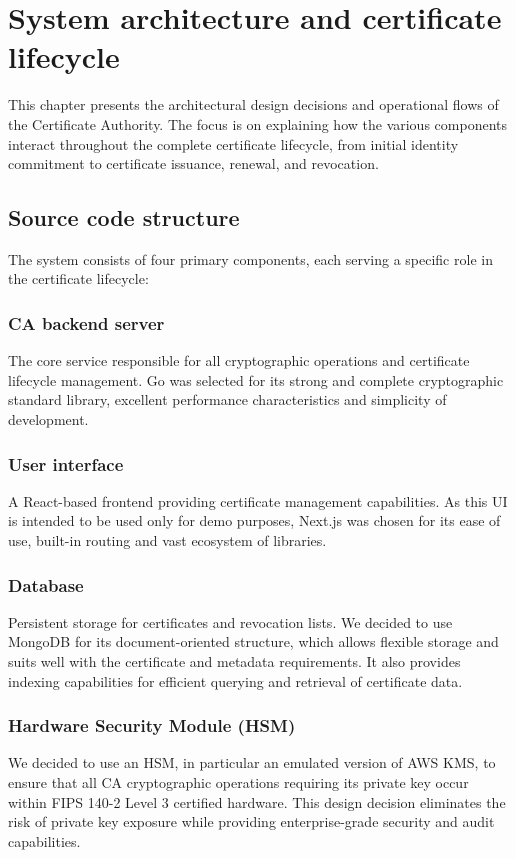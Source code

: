 \chapter{System architecture and certificate lifecycle}
\label{Architecture}

This chapter presents the architectural design decisions and  operational flows 
of the Certificate Authority. The focus is on explaining how the various 
components interact throughout the complete certificate lifecycle, from initial 
identity commitment to certificate issuance, renewal, and revocation.


\section{Source code structure}

The system consists of four primary components, each serving a specific role in 
the certificate lifecycle:

\subsection{CA backend server} 
The core service responsible for all cryptographic operations and certificate 
lifecycle management. Go was selected for its strong and complete cryptographic standard library, 
excellent performance characteristics and simplicity of development.

\subsection{User interface}
A React-based frontend providing certificate management capabilities. As this UI is intended 
to be used only for demo purposes, Next.js was chosen for its ease of use, built-in routing 
and vast ecosystem of libraries.

\subsection{Database}
Persistent storage for certificates and revocation lists. We decided to use MongoDB for its
document-oriented structure, which allows flexible storage and suits well with the certificate and 
metadata requirements. It also provides indexing capabilities for efficient 
querying and retrieval of certificate data.

\subsection{Hardware Security Module (HSM)}
We decided to use an HSM, in particular an emulated version of AWS KMS, to ensure that all CA 
cryptographic operations requiring its private key occur within FIPS 140-2 Level 3 certified hardware. 
This design decision eliminates the risk of private key exposure while providing 
enterprise-grade security and audit capabilities.

